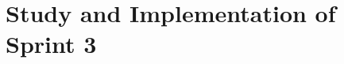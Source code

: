 \documentclass{polypfe}
\begin{document}







\chapter{Study and Implementation of Sprint 3}
\clearpage













\end{document}
